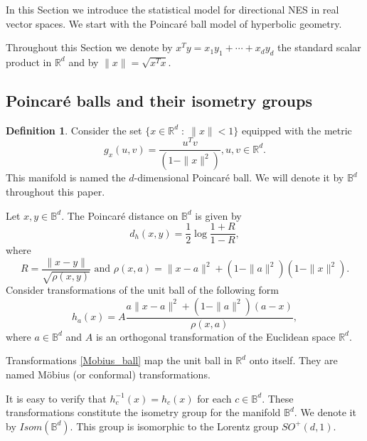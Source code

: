 \documentclass{article}
\theoremstyle{plain}%
\theoremstyle{definition}
\newtheorem{definition}{Definition}
\theoremstyle{remark}
\theoremstyle{prop}
\begin{document}
In this Section we introduce the statistical model for directional NES in real vector spaces. We start with the Poincar\' e ball model of hyperbolic geometry. 

Throughout this Section we denote by $x^T y = x_1 y_1 + \cdots + x_d y_d$ the standard scalar product in $\mathbb R^d$ and by $\| x \| = \sqrt{x^T x}$.

\subsection{Poincar\' e balls and their isometry groups}  

\begin{definition}
\label{Poin_ball_def}
Consider the set $\{x \in \mathbb{R}^d \; : \; \| x \|<1\}$ equipped with the metric $$g_x(u,v) = \frac{u^T v}{(1-\| x \|^2)}, u, v\in \mathbb{R}^d.$$ This manifold is named the $d$-dimensional Poincar\' e ball. We will denote it by $\mathbb{B}^d$ throughout this paper.
\end{definition}


Let $x,y \in \mathbb{B}^d$. The Poincar\'e distance on $\mathbb{B}^d$ is given by
\begin{equation}\label{pome}
d_h(x,y)=\frac{1}{2}\log \frac{1+R}{1-R},
\end{equation} 
where
 \begin{equation}
 \label{rho}
 R=\frac{\| x-y \|}{\sqrt{\rho(x,y)}} \mbox{ and } \rho(x,a)= \| x-a \|^2 + (1- \| a \|^2)(1- \| x \|^2).
 \end{equation}
Consider transformations of the unit ball of the following form
\begin{equation} 
\label{Mobius_ball}
h_a(x)= A \frac{a \| x-a \|^2+(1- \| a \|^2)(a-x)}{\rho(x,a)},
\end{equation}
where $a \in \mathbb{B}^d$ and $A$ is an orthogonal transformation of the Euclidean space $\mathbb{R}^d$.

Transformations \eqref{Mobius_ball} map the unit ball in $\mathbb{R}^d$ onto itself. They are named M\" obius (or conformal) transformations. 

It is easy to verify that $h_c^{-1}(x)=h_c(x)$ for each $c\in \mathbb{B}^d$. These transformations constitute the isometry group for the manifold ${\mathbb B}^d$. We denote it by $Isom(\mathbb{B}^d)$. This group is isomorphic to the Lorentz group $SO^+(d,1)$.
\end{document}
